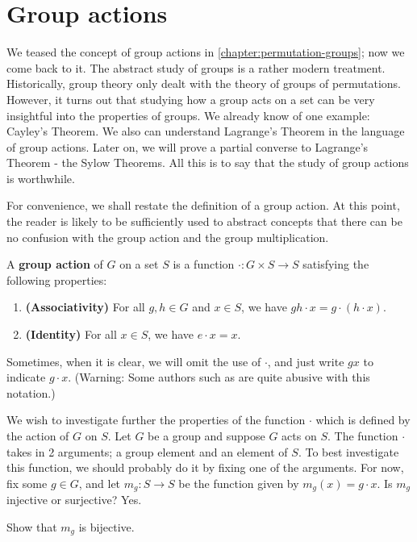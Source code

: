 \documentclass[./main.tex]{subfiles}
\begin{document}
\section{Group actions}
We teased the concept of group actions in \cref{chapter:permutation-groups}; now
we come back to it. The abstract study of groups is a rather modern treatment.
Historically, group theory only dealt with the theory of groups of permutations.
However, it turns out that studying how a group acts on a set can be very
insightful into the properties of groups. We already know of one example:
Cayley's Theorem. We also can understand Lagrange's Theorem in the language of
group actions. Later on, we will prove a partial converse to Lagrange's Theorem
- the Sylow Theorems. All this is to say that the study of group actions is
worthwhile.


For convenience, we shall restate the definition of a group action. At this
point, the reader is likely to be sufficiently used to abstract concepts that
there can be no confusion with the group action and the group multiplication.

\begin{definition}
\label{def:group-action-abstract}
    A \textbf{group action} of $G$ on a set $S$ is a function $\cdot: G \times S
    \to S$ satisfying the following properties:
    \begin{enumerate}[label=(\arabic*)]
        \item \textbf{(Associativity)} For all $g, h \in G$ and $x \in S$, we
        have $gh \cdot x = g \cdot (h \cdot x)$.
        \item \textbf{(Identity)} For all $x \in S$, we have $e \cdot x = x$.
    \end{enumerate}
\end{definition}
Sometimes, when it is clear, we will omit the use of $\cdot$, and just write
$gx$ to indicate $g \cdot x$. (Warning: Some authors such as
\autocite{Jacobson_2009} are quite abusive with this notation.)

We wish to investigate further the properties of the function $\cdot$ which is
defined by the action of $G$ on $S$. Let $G$ be a group and suppose $G$ acts on
$S$. The function $\cdot$ takes in 2 arguments; a group element and an element
of $S$. To best investigate this function, we should probably do it by fixing
one of the arguments. For now, fix some $g \in G$, and let $m_g: S \to S$ be the
function given by $m_g(x) = g \cdot x$. Is $m_g$ injective or surjective? Yes. 
\begin{exercise}
    Show that $m_g$ is bijective.
\end{exercise}
\end{document}
